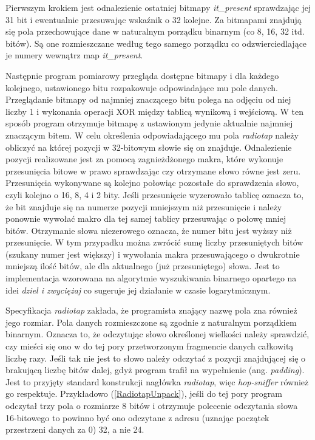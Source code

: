 Pierwszym krokiem jest odnalezienie ostatniej bitmapy \emph{it\_present} sprawdzając jej 31 bit i ewentualnie przesuwając wskaźnik o 32 kolejne. Za bitmapami znajdują się pola przechowujące dane w naturalnym porządku binarnym (co 8, 16, 32 itd. bitów). Są one rozmieszczane według tego samego porządku co odzwierciedlające je numery wewnątrz map \emph{it\_present}.

Następnie program pomiarowy przegląda dostępne bitmapy i dla każdego kolejnego, ustawionego bitu rozpakowuje odpowiadające mu pole danych. Przeglądanie bitmapy od najmniej znaczącego bitu polega na odjęciu od niej liczby 1 i wykonania operacji XOR między tablicą wynikową i wejściową. W ten sposób program otrzymuje bitmapę z ustawionym jedynie aktualnie najmniej znaczącym bitem. W celu określenia odpowiadającego mu pola \emph{radiotap} należy obliczyć na której pozycji w 32-bitowym słowie się on znajduje. Odnalezienie pozycji realizowane jest za pomocą zagnieżdżonego makra, które wykonuje przesunięcia bitowe w prawo sprawdzając czy otrzymane słowo równe jest zeru. Przesunięcia wykonywane są kolejno połowiąc pozostałe do sprawdzenia słowo, czyli kolejno o 16, 8, 4 i 2 bity. Jeśli przesunięcie wyzerowało tablicę oznacza to, że bit znajduje się na numerze pozycji mniejszym niż przesunięcie i należy ponownie wywołać makro dla tej samej tablicy przesuwając o połowę mniej bitów. Otrzymanie słowa niezerowego oznacza, że numer bitu jest wyższy niż przesunięcie. W tym przypadku można zwrócić sumę liczby przesuniętych bitów (szukany numer jest większy) i wywołania makra przesuwającego o dwukrotnie mniejszą ilość bitów, ale dla aktualnego (już przesuniętego) słowa. Jest to implementacja wzorowana na algorytmie wyszukiwania binarnego opartego na idei \emph{dziel i zwyciężaj} co sugeruje jej działanie w czasie logarytmicznym. 

Specyfikacja \emph{radiotap} zakłada, że programista znający nazwę pola zna również jego rozmiar. Pola danych rozmieszczone są zgodnie z naturalnym porządkiem binarnym. Oznacza to, że odczytując słowo określonej wielkości należy sprawdzić, czy mieści się ono w do tej pory przetworzonym fragmencie danych całkowitą liczbę razy. Jeśli tak nie jest to słowo należy odczytać z pozycji znajdującej się o brakującą liczbę bitów dalej, gdyż program trafił na wypełnienie (ang. \emph{padding}). Jest to przyjęty standard konstrukcji nagłówka \emph{radiotap}, więc \emph{hop-sniffer} również go respektuje. Przykładowo (\ref{RadiotapUnpack}), jeśli do tej pory program odczytał trzy pola o rozmiarze 8 bitów i otrzymuje polecenie odczytania słowa 16-bitowego to powinno być ono odczytane z adresu (uznając początek przestrzeni danych za 0) 32, a nie 24. 

